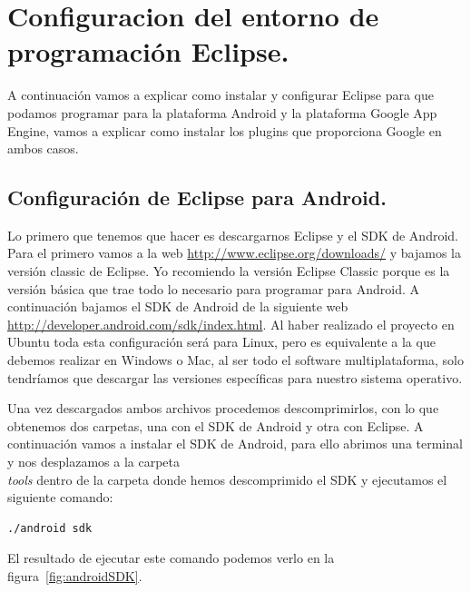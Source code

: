 \chapter[Configuración de Eclipse.]{Configuracion del entorno de programación Eclipse.}\label{cap:apendiceA}

A continuación vamos a explicar como instalar y configurar Eclipse para que podamos programar para la plataforma Android y la plataforma Google App Engine, vamos a explicar como instalar los plugins que proporciona Google en ambos casos.

\section{Configuración de Eclipse para Android.}\label{cap:configuracionAndroidEclipse}

Lo primero que tenemos que hacer es descargarnos Eclipse y el SDK de Android. Para el primero vamos a la web \url{http://www.eclipse.org/downloads/} y bajamos la versión classic de Eclipse. Yo recomiendo la versión Eclipse Classic porque es la versión básica que trae todo lo necesario para programar para Android. A continuación bajamos el SDK de Android de la siguiente web \url{http://developer.android.com/sdk/index.html}. Al haber realizado el proyecto en Ubuntu toda esta configuración será para Linux, pero es equivalente a la que debemos realizar en Windows o Mac, al ser todo el software multiplataforma, solo tendríamos que descargar las versiones específicas para nuestro sistema operativo.

Una vez descargados ambos archivos procedemos descomprimirlos, con lo que obtenemos dos carpetas, una con el SDK de Android y otra con Eclipse. A continuación vamos a instalar el SDK de Android, para ello abrimos una terminal y nos desplazamos a la carpeta \textit{\\tools} dentro de la carpeta donde hemos descomprimido el SDK y ejecutamos el siguiente comando: 

\begin{lstlisting}[style=consola]
./android sdk
\end{lstlisting}

El resultado de ejecutar este comando podemos verlo en la figura~\ref{fig:androidSDK}.

